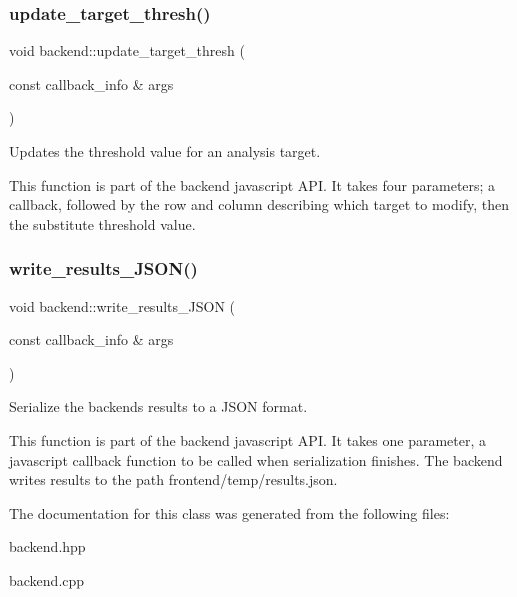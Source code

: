 \subsubsection{\texorpdfstring{update\+\_\+target\+\_\+thresh()}{update\_target\_thresh()}}
{\footnotesize\ttfamily void backend\+::update\+\_\+target\+\_\+thresh (\begin{DoxyParamCaption}\item[{const callback\+\_\+info \&}]{args }\end{DoxyParamCaption})\hspace{0.3cm}{\ttfamily [static]}}



Updates the threshold value for an analysis target. 

This function is part of the backend javascript A\+PI. It takes four parameters; a callback, followed by the row and column describing which target to modify, then the substitute threshold value. \mbox{\label{classbackend_a91fe1ff0bbdc9e29d6958e0cf72d10ba}} 
\subsubsection{\texorpdfstring{write\+\_\+results\+\_\+\+J\+S\+O\+N()}{write\_results\_JSON()}}
{\footnotesize\ttfamily void backend\+::write\+\_\+results\+\_\+\+J\+S\+ON (\begin{DoxyParamCaption}\item[{const callback\+\_\+info \&}]{args }\end{DoxyParamCaption})\hspace{0.3cm}{\ttfamily [static]}}



Serialize the backend\textquotesingle{}s results to a J\+S\+ON format. 

This function is part of the backend javascript A\+PI. It takes one parameter, a javascript callback function to be called when serialization finishes. The backend writes results to the path frontend/temp/results.\+json. 

The documentation for this class was generated from the following files\+:\begin{DoxyCompactItemize}
\item 
backend.\+hpp\item 
backend.\+cpp\end{DoxyCompactItemize}
